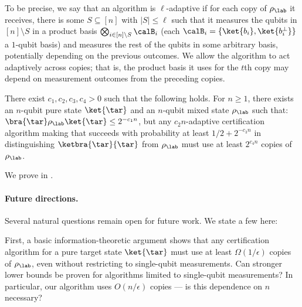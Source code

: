 To be precise, we say that an algorithm is $\ell$-adaptive if for each copy of $\rho_{\lab}$ it receives, there is some $S\subseteq[n]$ with $|S|\leq \ell$ such that it measures the qubits in $[n]\setminus S$ in a product basis $\bigotimes_{i\in[n]\setminus S}\calB_i$ (each $\calB_i = \{\ket{\smash{b_i}}, \ket{\smash{b_i^\bot}}\}$ a $1$-qubit basis) and measures the rest of the qubits in some arbitrary basis, potentially depending on the previous outcomes.  We allow the algorithm to act adaptively across copies; that is, the product basis it uses for the $t$th copy may depend on measurement outcomes from the preceding copies.
\begin{theorem}\label{prop:lower bound}
    There exist $c_1, c_2, c_3 ,c_4> 0$ such that the following holds. For $n\geq1$, there exists an $n$-qubit pure state $\ket{\tar}$ and an $n$-qubit mixed state $\rho_{\lab}$ such that: $\bra{\tar}\rho_{\lab}\ket{\tar}\leq 2^{-c_1n}$, but any $c_2n$-adaptive certification algorithm making that succeeds with probability at least $1/2 + 2^{-c_3 n}$ in distinguishing $\ketbra{\tar}{\tar}$ from $\rho_{\lab}$ must use at least $2^{c_4 n}$ copies of~$\rho_{\lab}$. 
\end{theorem}
We prove  in .


\paragraph{Future directions.} Several natural questions remain open for future work. We state a few here:

First, a basic information-theoretic argument shows that any certification algorithm for a pure target state $\ket{\tar}$ must use at least $\Omega(1/\epsilon)$ copies of $\rho_{\lab}$, even without restricting to single-qubit measurements. Can stronger lower bounds be proven for algorithms limited to single-qubit measurements? In particular, our algorithm uses $O(n/\epsilon)$ copies --- is this dependence on $n$ necessary?

